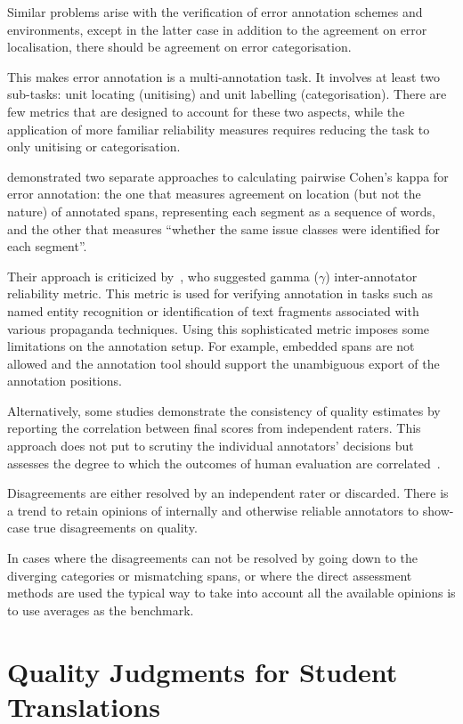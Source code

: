 Similar problems arise with the verification of error annotation schemes and environments, except in the latter case in addition to the agreement on error localisation, there should be agreement on error categorisation.

This makes error annotation is a multi-annotation task. It involves at least two sub-tasks: unit locating (unitising) and unit labelling (categorisation). There are few metrics that are designed to account for these two aspects, while the application of more familiar reliability measures requires reducing the task to only unitising or categorisation.

\citet[p.33]{Lommel2014} demonstrated two separate approaches to calculating pairwise Cohen's kappa for error annotation: the one that measures agreement on location (but not the nature) of annotated spans, representing each segment as a sequence of words, and the other that measures ``whether the same issue classes were identified for each segment''.

Their approach is criticized by~\citet[p. 444-445]{Mathet2015}, who suggested gamma ($\gamma$) inter-annotator reliability metric. This metric is used for verifying annotation in tasks such as named entity recognition or identification of text fragments associated with various propaganda techniques. Using this sophisticated metric imposes some limitations on the annotation setup. For example, embedded spans are not allowed and the annotation tool should support the unambiguous export of the annotation positions.

Alternatively, some studies demonstrate the consistency of quality estimates by reporting the correlation between final scores from independent raters. This approach does not put to scrutiny the individual annotators' decisions but assesses the degree to which the outcomes of human evaluation are correlated~\cite{Eyckmans2009}.

Disagreements are either resolved by an independent rater or discarded. There is a trend to retain opinions of internally and otherwise reliable annotators to show-case true disagreements on quality.

In cases where the disagreements can not be resolved by going down to the diverging categories or mismatching spans, or where the direct assessment methods are used the typical way to take into account all the available opinions is to use averages as the benchmark.   

\section{\label{sec:mygold}Quality Judgments for Student Translations}

